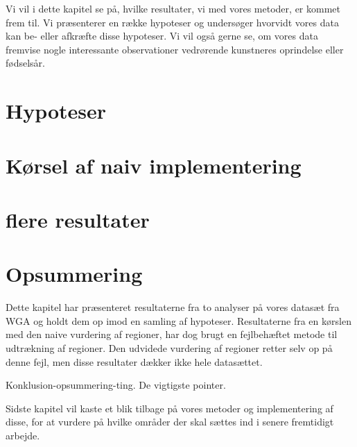 {
{\sffamily Vi vil i dette kapitel se på, hvilke resultater, vi med vores
metoder, er kommet frem til. Vi præsenterer en række hypoteser og
undersøger hvorvidt vores data kan be- eller afkræfte disse hypoteser.
Vi vil også gerne se, om vores data fremvise nogle interessante
observationer vedrørende kunstneres oprindelse eller fødselsår.
}

\section{Hypoteser}


\section{Kørsel af naiv implementering\label{section_naiv_koersel}}

\clearpage

\section{flere resultater}


\section*{Opsummering}
Dette kapitel har præsenteret resultaterne fra to analyser på vores
datasæt fra WGA og holdt dem op imod en samling af hypoteser.
Resultaterne fra en kørslen med den naive vurdering af regioner, har dog
brugt en fejlbehæftet metode til udtrækning af regioner.  Den udvidede
vurdering af regioner retter selv op på denne fejl, men disse resultater
dækker ikke hele datasættet.

Konklusion-opsummering-ting. De vigtigste pointer.

Sidste kapitel vil kaste et blik tilbage på vores metoder og
implementering af disse, for at vurdere på hvilke områder der skal
sættes ind i senere fremtidigt arbejde.

}
